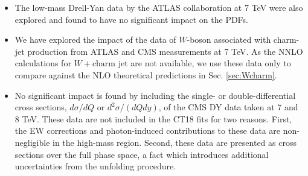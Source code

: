 \begin{itemize}

\item The low-mass Drell-Yan data by the ATLAS collaboration at 7 TeV \cite{Aad:2014qja} were also explored and found to have no significant impact on the PDFs. 

\item We have explored the impact of the data of $W$-boson associated with charm-jet production from ATLAS \cite{Aad:2014xca} and CMS \cite{Chatrchyan:2013uja} measurements at 7 TeV. As the NNLO calculations for $W+\mbox{charm jet}$ are not available, we use these data only to compare against the NLO theoretical predictions in Sec. \ref{sec:Wcharm}. 

\item No significant impact is found by including the single- or double-differential cross sections, $d\sigma/dQ$ or $d^2\sigma/(dQdy)$, of the CMS DY data taken at 7 \cite{Chatrchyan:2013tia} and 8 \cite{CMS:2014jea} TeV. These data are not included in the CT18 fits for two reasons. First, the EW corrections and photon-induced contributions to these data are non-negligible in the high-mass region. Second, these data are presented as cross sections over the full phase space, a fact which introduces additional uncertainties from the unfolding procedure.
\end{itemize} 




